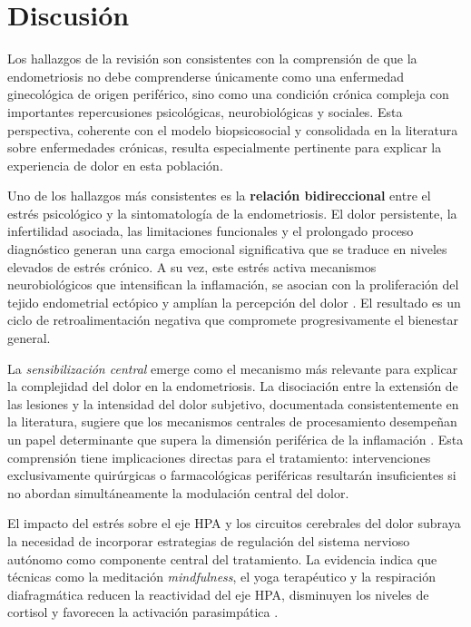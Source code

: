 \documentclass[12pt, a4paper]{article}
\begin{document}
\section{Discusión}

Los hallazgos de la revisión son consistentes con la comprensión de que la endometriosis no debe comprenderse únicamente
como una enfermedad ginecológica de origen periférico, sino como una condición crónica compleja
con importantes repercusiones psicológicas, neurobiológicas y sociales. Esta perspectiva,
coherente con el modelo biopsicosocial y consolidada en la literatura sobre enfermedades
crónicas, resulta especialmente pertinente para explicar la experiencia de dolor en esta
población.

Uno de los hallazgos más consistentes es la \textbf{relación bidireccional} entre el estrés
psicológico y la sintomatología de la endometriosis. El dolor persistente, la infertilidad
asociada, las limitaciones funcionales y el prolongado proceso diagnóstico generan una carga
emocional significativa que se traduce en niveles elevados de estrés crónico. A su vez, este
estrés activa mecanismos neurobiológicos que intensifican la inflamación, se asocian con la
proliferación del tejido endometrial ectópico y amplían la percepción del dolor
\parencite{Wang2021, Machairiotis2021}. El resultado es un ciclo de retroalimentación negativa
que compromete progresivamente el bienestar general.

La \textit{sensibilización central} emerge como el mecanismo más relevante para explicar la
complejidad del dolor en la endometriosis. La disociación entre la extensión de las lesiones y
la intensidad del dolor subjetivo, documentada consistentemente en la literatura, sugiere que
los mecanismos centrales de procesamiento desempeñan un papel determinante que supera la
dimensión periférica de la inflamación \parencite{AsSanie2012}. Esta comprensión tiene
implicaciones directas para el tratamiento: intervenciones exclusivamente quirúrgicas o
farmacológicas periféricas resultarán insuficientes si no abordan simultáneamente la modulación
central del dolor.

El impacto del estrés sobre el eje HPA y los circuitos cerebrales del dolor subraya la
necesidad de incorporar estrategias de regulación del sistema nervioso autónomo como componente
central del tratamiento. La evidencia indica que técnicas como la meditación \textit{mindfulness},
el yoga terapéutico y la respiración diafragmática reducen la reactividad del eje HPA, disminuyen
los niveles de cortisol y favorecen la activación parasimpática \parencite{Tracey2021, Apkarian2021}.
\end{document}
